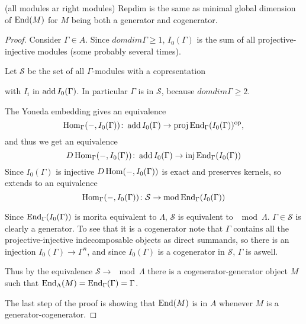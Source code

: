 \begin{prop}\label{prop:repdim_auslander_generator} 
	(all modules ar right modules)
	Repdim is the same as minimal global dimension of $\operatorname{End}(M)$ for $M$ being both a generator and cogenerator. 
	\begin{proof}
		Consider $\Gamma \in A$. Since $domdim\Gamma \geq 1$, $I_0(\Gamma)$ is the sum of all projective-injective modules (some probably several times). 
		
		Let $\mathcal S$ be the set of all $\Gamma$-modules with a copresentation
		\begin{center}
		\end{center}
		with $I_i$ in $\operatorname{add} I_0(\Gamma)$. In particular $\Gamma$ is in $\mathcal S$, because $domdim\Gamma \geq 2$.
		
		The Yoneda embedding gives an equivalence $$\operatorname{Hom}_\Gamma(-,I_0(\Gamma))\colon\operatorname{add} I_0(\Gamma) \to \operatorname{proj}\operatorname{End}_\Gamma(I_0(\Gamma))^{\operatorname{op}},$$ and thus we get an equivalence $$D\operatorname{Hom}_\Gamma(-,I_0(\Gamma))\colon\operatorname{add} I_0(\Gamma) \to \operatorname{inj}\operatorname{End}_\Gamma(I_0(\Gamma))$$
		Since $I_0(\Gamma)$ is injective $D\operatorname{Hom}(-,I_0(\Gamma))$ is exact and preserves kernels, so extends to an equivalence
		$$\operatorname{Hom}_\Gamma(-,I_0(\Gamma))\colon\mathcal S \to \operatorname{mod} \operatorname{End}_\Gamma(I_0(\Gamma))$$
		
		Since $\operatorname{End}_\Gamma(I_0(\Gamma))$ is morita equivalent to $\Lambda$, $\mathcal S$ is equivalent to $\mod \Lambda$. $\Gamma \in \mathcal S$ is clearly a generator. To see that it is a cogenerator note that $\Gamma$ contains all the projective-injective indecomposable objects as direct summands, so there is an injection $I_0(\Gamma) \to \Gamma^n$, and since $I_0(\Gamma)$ is a cogenerator in $\mathcal S$, $\Gamma$ is aswell.
		
		Thus by the equivalence $\mathcal S \to \mod\Lambda$ there is a cogenerator-generator object $M$ such that $\operatorname{End}_\Lambda(M) = \operatorname{End}_\Gamma(\Gamma)=\Gamma$.
		
		The last step of the proof is showing that $\operatorname{End}(M)$ is in $A$ whenever $M$ is a generator-cogenerator.
		

\end{proof}
\end{prop}
